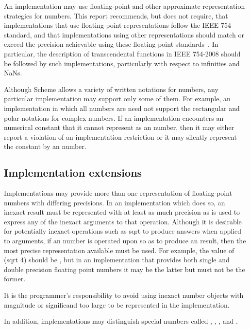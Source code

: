 \vest An implementation may use floating-point and other approximate 
representation strategies for  numbers.
This report recommends, but does not require, that 
implementations that use
floating-point representations
follow the IEEE 754 standard,
and that implementations using
other representations should match or exceed the precision achievable
using these floating-point standards~\cite{IEEE}.
In particular, the description of transcendental functions in IEEE 754-2008
should be followed by such implementations, particularly with respect
to infinities and NaNs.

Although Scheme allows a variety of written
notations for
numbers, any particular implementation may support only some of them.
For example, an implementation in which all numbers are 
need not support the rectangular and polar notations for complex
numbers.  If an implementation encounters an  numerical constant that
it cannot represent as an  number, then it may either report a
violation of an implementation restriction or it may silently represent the
constant by an  number.

\subsection{Implementation extensions}

\vest Implementations may provide more than one representation of
floating-point numbers with differing precisions.  In an implementation
which does so, an inexact result must be represented with at least
as much precision as is used to express any of the inexact arguments
to that operation.  Although it is desirable for potentially inexact
operations such as {\cf sqrt} to produce  answers when
applied to  arguments, if an  number is operated
upon so as to produce an  result, then the most precise
representation available must be used.  For example, the value of {\cf
(sqrt 4)} should be {}, but in an implementation that provides both
single and double precision floating point numbers it may be the latter
but must not be the former.

It is the programmer's responsibility to avoid using inexact
number objects with magnitude or significand too large to be
represented in the implementation.

In addition, implementations may
distinguish special numbers called ,
, , and .

